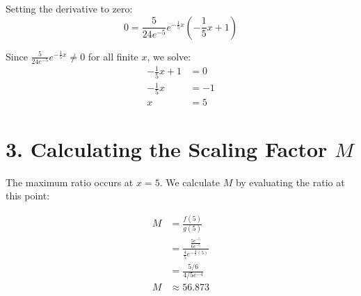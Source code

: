 \documentclass[11pt]{article}
\begin{document}
Setting the derivative to zero:
\[ 0 = \frac{5}{24e^{-5}} e^{-\frac{1}{5}x} \left( -\frac{1}{5}x + 1 \right) \]

Since $\frac{5}{24e^{-5}} e^{-\frac{1}{5}x} \neq 0$ for all finite $x$, we solve:
\begin{align*}
-\frac{1}{5}x + 1 &= 0 \\
-\frac{1}{5}x &= -1 \\
x &= 5
\end{align*}

\section*{3. Calculating the Scaling Factor $M$}
The maximum ratio occurs at $x = 5$. We calculate $M$ by evaluating the ratio at this point:

\begin{align*}
M &= \frac{f(5)}{g(5)} \\
&= \frac{\frac{5e^{-5}}{6e^{-5}}}{\frac{4}{5}e^{-\frac{4}{5}(5)}} \\
&= \frac{5/6}{4/5 e^{-4}} \\
M &\approx 56.873
\end{align*}
\end{document}
